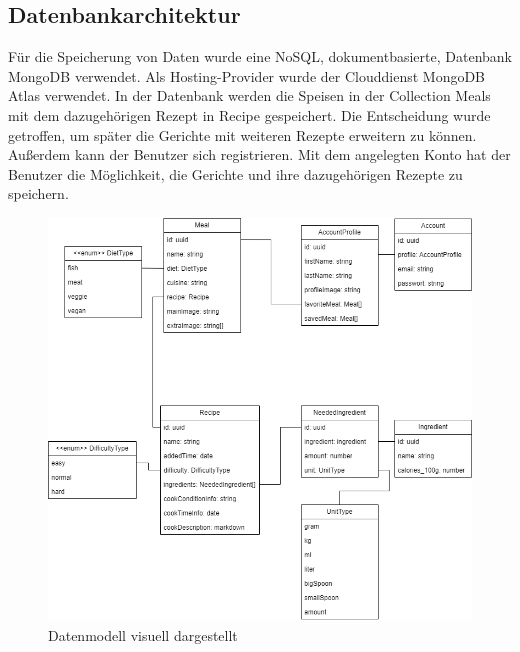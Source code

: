 \documentclass[conference,a4paper,flushend]{cs-techrep}
\begin{document}
\subsection{Datenbankarchitektur}
Für die Speicherung von Daten wurde eine NoSQL, dokumentbasierte, Datenbank MongoDB verwendet. Als Hosting-Provider wurde der Clouddienst MongoDB Atlas verwendet. In der Datenbank werden die Speisen in der Collection Meals mit dem dazugehörigen Rezept in Recipe gespeichert. Die Entscheidung wurde getroffen, um später die Gerichte mit weiteren Rezepte erweitern zu können. Außerdem kann der Benutzer sich registrieren. Mit dem angelegten Konto hat der Benutzer die Möglichkeit, die Gerichte und ihre dazugehörigen Rezepte zu speichern.
\begin{figure}[h]
    \centering
    \includegraphics[width=1\linewidth]{datamodell.png}
    \caption{Datenmodell visuell dargestellt}
    \label{fig:enter-label}
\end{figure}
\end{document}
